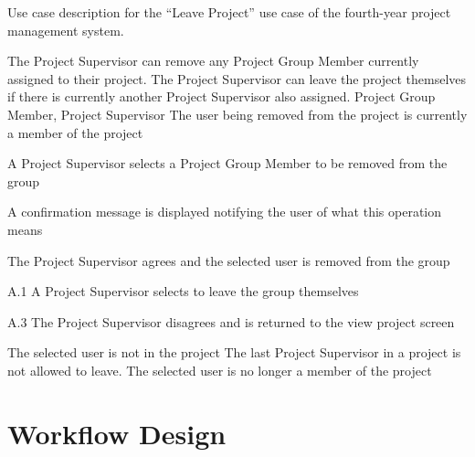 \begin{table}
  \centering
  \caption{Use case description for the ``Leave Project'' use case of the fourth-year project management system.}
  \label{tbl:use-case-leave-project}

  \begin{usecase}
    The Project Supervisor can remove any Project Group Member currently assigned to their project. The Project Supervisor can leave the project themselves if there is currently another Project Supervisor also assigned.
    Project Group Member, Project Supervisor
    The user being removed from the project is currently a member of the project
    \ucnormal
    \begin{ucenum}
      \item A Project Supervisor selects a Project Group Member to be removed from the group
      \item A confirmation message is displayed notifying the user of what this operation means
      \item The Project Supervisor agrees and the selected user is removed from the group
    \end{ucenum}
    \begin{ucenum}
      \item [A.1] A Project Supervisor selects to leave the group themselves
    \end{ucenum}
    \begin{ucenum}
      \item [A.3] The Project Supervisor disagrees and is returned to the view project screen
    \end{ucenum}
    The selected user is not in the project
    The last Project Supervisor in a project is not allowed to leave.
    The selected user is no longer a member of the project
  \end{usecase}
\end{table}


\FloatBarrier

\section{Workflow Design}
\label{sec:4ys-workflow-design}

